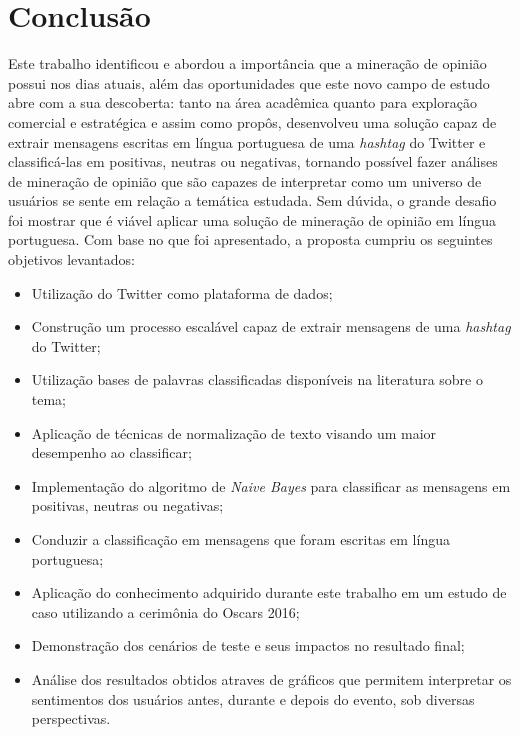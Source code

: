 \chapter{Conclusão} \label{cap:conclusao}
Este trabalho identificou e abordou a importância que a mineração de opinião possui nos dias atuais, além das oportunidades que este novo campo de estudo abre com a sua descoberta: tanto na área acadêmica quanto para exploração comercial e estratégica e assim como propôs, desenvolveu uma solução capaz de extrair mensagens escritas em língua portuguesa de uma \textit{hashtag} do Twitter e classificá-las em positivas, neutras ou negativas, tornando possível fazer análises de mineração de opinião que são capazes de interpretar como um universo de usuários se sente em relação a temática estudada. Sem dúvida, o grande desafio foi mostrar que é viável aplicar uma solução de mineração de opinião em língua portuguesa.
Com base no que foi apresentado, a proposta cumpriu os seguintes objetivos levantados:

\begin{itemize}
	\item Utilização do Twitter como plataforma de dados;
	\item Construção um processo escalável capaz de extrair mensagens de uma \textit{hashtag} do Twitter;
	\item Utilização bases de palavras classificadas disponíveis na literatura sobre o tema;
	\item Aplicação de técnicas de normalização de texto visando um maior desempenho ao classificar;
	\item Implementação do algoritmo de \textit{Naive Bayes} para classificar as mensagens em positivas, neutras ou negativas;
	\item Conduzir a classificação em mensagens que foram escritas em língua portuguesa;
	\item Aplicação do conhecimento adquirido durante este trabalho em um estudo de caso utilizando a cerimônia do Oscars 2016;
	\item Demonstração dos cenários de teste e seus impactos no resultado final;
	\item Análise dos resultados obtidos atraves de gráficos que permitem interpretar os sentimentos dos usuários antes, durante e depois do evento, sob diversas perspectivas.
\end{itemize}

